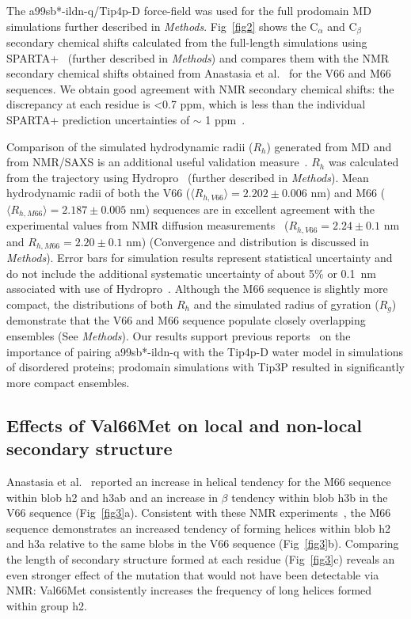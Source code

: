 \documentclass[10pt,letterpaper]{article}
\begin{document}
The a99sb*-ildn-q/Tip4p-D force-field was used for the full prodomain MD simulations further described in {\it Methods}. Fig~\ref{fig2} shows the C$_{\alpha}$ and C$_{\beta}$ secondary chemical shifts calculated from the full-length simulations using SPARTA+~\cite{Shen2010} (further described in {\it Methods}) and compares them with the NMR secondary chemical shifts obtained from Anastasia et al.~\cite{Anastasia2013} for the V66 and M66 sequences. We obtain good agreement with NMR secondary chemical shifts: the discrepancy at each residue is \textless 0.7 ppm, which is less than the individual SPARTA+ prediction uncertainties of $\sim$ 1 ppm~\cite{Shen2010}. 

Comparison of the simulated hydrodynamic radii ($R_h$) generated from MD and from NMR/SAXS is an additional useful validation measure~\cite{Mercadante2015, Rauscher2015, Meng2018}. $R_h$ was calculated from the trajectory using Hydropro~\cite{Ortega2011} (further described in {\it Methods}). Mean hydrodynamic radii of both the V66 ($\langle R_{h, V66}\rangle=2.202\pm{0.006}$ nm) and M66 ($\langle R_{h, M66}\rangle=2.187\pm{0.005}$ nm) sequences are in excellent agreement with the experimental values from NMR diffusion measurements~\cite{Anastasia2013} ($R_{h, V66}=2.24\pm{0.1}$ nm and $R_{h, M66}=2.20\pm{0.1}$ nm) (Convergence and distribution is discussed in {\it Methods}). Error bars for simulation results represent statistical uncertainty and do not include the additional systematic uncertainty of about 5\% or 0.1~nm associated with use of Hydropro~\cite{Ortega2011}. Although the M66 sequence is slightly more compact, the distributions of both $R_h$ and the simulated radius of gyration ($R_g$) demonstrate that the V66 and M66 sequence populate closely overlapping ensembles (See {\it Methods}). Our results support previous reports~\cite{Piana2015, Robustelli2018} on the importance of pairing a99sb*-ildn-q with the Tip4p-D water model in simulations of disordered proteins; prodomain simulations with Tip3P resulted in significantly more compact ensembles.

\subsection*{Effects of Val66Met on local and non-local secondary structure}

Anastasia et al.~\cite{Anastasia2013} reported an increase in helical tendency for the M66 sequence within blob h2 and h3ab and an increase in $\beta$ tendency within blob h3b in the V66 sequence (Fig~\ref{fig3}a). Consistent with these NMR experiments~\cite{Anastasia2013}, the M66 sequence demonstrates an increased tendency of forming helices within blob h2 and h3a relative to the same blobs in the V66 sequence (Fig~\ref{fig3}b). Comparing the length of secondary structure formed at each residue (Fig~\ref{fig3}c) reveals an even stronger effect of the mutation that would not have been detectable via NMR: Val66Met consistently increases the frequency of long helices formed within group h2. 
\end{document}
